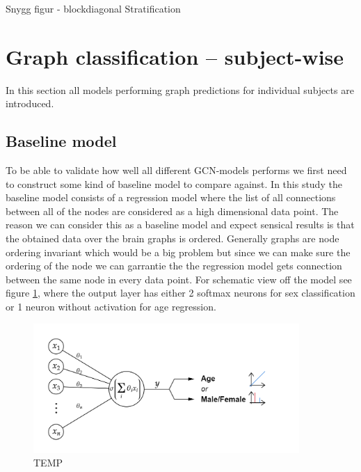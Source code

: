 Snygg figur - blockdiagonal
Stratification

\section{Graph classification -- subject-wise}
In this section all models performing graph predictions for individual subjects are introduced.

\subsection{Baseline model}
To be able to validate how well all different GCN-models performs we first need to construct some kind of baseline model to compare against. In this study the baseline model consists of a regression model where the list of all connections between all of the nodes are considered as a high dimensional data point. The reason we can consider this as a baseline model and  expect sensical results is that the obtained data over the brain graphs is ordered. Generally graphs are node ordering invariant which would be a big problem but since we can make sure the ordering of the node we can garrantie the the regression model gets connection between the same node in every data point. For schematic view off the model see figure \ref{fig:Graph_class_baseline}, where the output layer has either 2 softmax neurons for sex classification or 1 neuron without activation for age regression. 

%         

\begin{figure}[H]
    \includegraphics[width=0.9\textwidth]{chapters/images_methods/ffnn.png}
    \caption{TEMP}
    \label{fig:Graph_class_baseline}
\end{figure}

